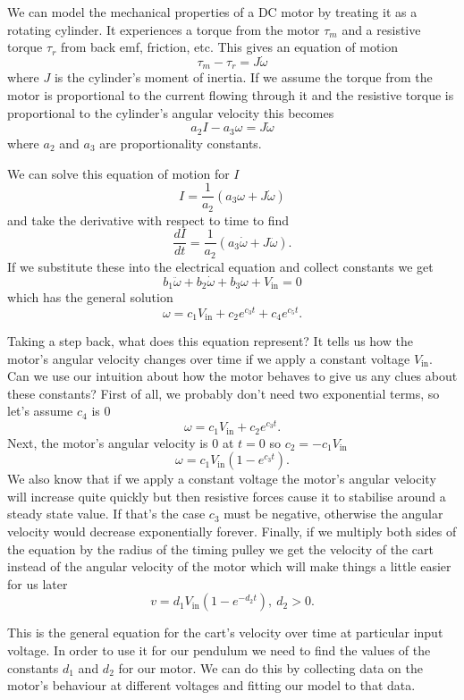 \documentclass{article}
\begin{document}
We can model the mechanical properties of a DC motor by treating it as a rotating cylinder. It experiences a torque from the motor $\tau_m$ and a resistive torque $\tau_r$ from back emf, friction, etc. This gives an equation of motion \[\tau_m - \tau_r = J \dot{\omega}\] where $J$ is the cylinder's moment of inertia. If we assume the torque from the motor is proportional to the current flowing through it and the resistive torque is proportional to the cylinder's angular velocity this becomes \[a_2 I - a_3 \omega = J \dot{\omega}\] where $a_2$ and $a_3$ are proportionality constants.

We can solve this equation of motion for $I$ \[I = \frac{1}{a_2} (a_3 \omega + J \dot{\omega})\] and take the derivative with respect to time to find \[\frac{d I}{d t} = \frac{1}{a_2} (a_3 \dot{\omega} + J \ddot{\omega}).\] If we substitute these into the electrical equation and collect constants we get \[b_1 \ddot{\omega} + b_2 \dot{\omega} + b_3 \omega + V_\text{in} = 0\] which has the general solution \[\omega = c_1 V_\text{in} + c_2 e^{c_3 t} + c_4 e^{c_5 t}.\]

Taking a step back, what does this equation represent? It tells us how the motor's angular velocity changes over time if we apply a constant voltage $V_\text{in}$. Can we use our intuition about how the motor behaves to give us any clues about these constants? First of all, we probably don't need two exponential terms, so let's assume $c_4$ is $0$ \[\omega = c_1 V_\text{in} + c_2 e^{c_3 t}.\] Next, the motor's angular velocity is $0$ at $t = 0$ so $c_2 = -c_1 V_\text{in}$ \[\omega = c_1 V_\text{in} (1 - e^{c_3 t}).\] We also know that if we apply a constant voltage the motor's angular velocity will increase quite quickly but then resistive forces cause it to stabilise around a steady state value. If that's the case $c_3$ must be negative, otherwise the angular velocity would decrease exponentially forever. Finally, if we multiply both sides of the equation by the radius of the timing pulley we get the velocity of the cart instead of the angular velocity of the motor which will make things a little easier for us later \[v = d_1 V_\text{in} (1 - e^{-d_2 t}), \ d_2 > 0.\]

This is the general equation for the cart's velocity over time at particular input voltage. In order to use it for our pendulum we need to find the values of the constants $d_1$ and $d_2$ for our motor. We can do this by collecting data on the motor's behaviour at different voltages and fitting our model to that data.
\end{document}
